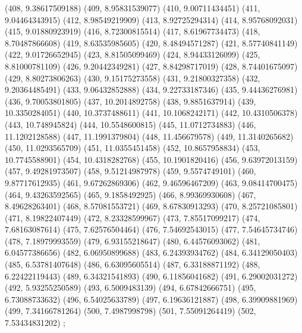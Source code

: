 {					(408, 9.38617509188)
					(409, 8.95831539077)
					(410, 9.00711434451)
					(411, 9.04464343915)
					(412, 8.98549219909)
					(413, 8.92725294314)
					(414, 8.95768092031)
					(415, 9.01880923919)
					(416, 8.72300815514)
					(417, 8.61967734473)
					(418, 8.70487866608)
					(419, 8.63535985605)
					(420, 8.48494571287)
					(421, 8.57740841149)
					(422, 9.01726652945)
					(423, 8.81505099469)
					(424, 8.94433126099)
					(425, 8.81000781109)
					(426, 9.20442349281)
					(427, 8.84298717019)
					(428, 8.74401675097)
					(429, 8.80273806263)
					(430, 9.15175273558)
					(431, 9.21800327358)
					(432, 9.20364485491)
					(433, 9.06432852888)
					(434, 9.22733187346)
					(435, 9.44436276981)
					(436, 9.70053801805)
					(437, 10.2014892758)
					(438, 9.8851637914)
					(439, 10.3350284051)
					(440, 10.3737488611)
					(441, 10.1068242171)
					(442, 10.4310506378)
					(443, 10.748945824)
					(444, 10.5548600815)
					(445, 11.0712734883)
					(446, 11.1202128588)
					(447, 11.1991379804)
					(448, 11.456679578)
					(449, 11.3140265682)
					(450, 11.0293565709)
					(451, 11.0355451458)
					(452, 10.8657958834)
					(453, 10.7745588901)
					(454, 10.4318282768)
					(455, 10.1901820416)
					(456, 9.63972013159)
					(457, 9.49281973507)
					(458, 9.51214987978)
					(459, 9.5574749101)
					(460, 9.87717612935)
					(461, 9.67262869306)
					(462, 9.46596467209)
					(463, 9.08414700475)
					(464, 9.43263592565)
					(465, 9.1858492925)
					(466, 8.99369930608)
					(467, 8.49628263401)
					(468, 8.57081553721)
					(469, 8.67830913293)
					(470, 8.25721085801)
					(471, 8.19822407449)
					(472, 8.23328599967)
					(473, 7.85517099217)
					(474, 7.68163087614)
					(475, 7.62576504464)
					(476, 7.54692543015)
					(477, 7.54645734746)
					(478, 7.18979993559)
					(479, 6.93155218647)
					(480, 6.44576093062)
					(481, 6.04577386656)
					(482, 6.06950899688)
					(483, 6.24393934762)
					(484, 6.34129050403)
					(485, 6.53781407648)
					(486, 6.63095605514)
					(487, 6.33188871192)
					(488, 6.22422119443)
					(489, 6.34321541893)
					(490, 6.11856041682)
					(491, 6.29002031272)
					(492, 5.93255250589)
					(493, 6.5009483139)
					(494, 6.67842666751)
					(495, 6.73088733632)
					(496, 6.54025633789)
					(497, 6.19636121887)
					(498, 6.39909881969)
					(499, 7.34166781264)
					(500, 7.4987998798)
					(501, 7.55091264419)
					(502, 7.53434831202)
				};
